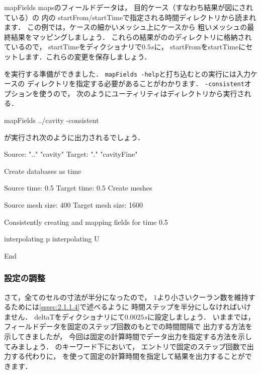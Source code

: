 mapFields mapsのフィールドデータは，
目的ケース（すなわち結果が図にされている）の
%
%
内の
startFrom/startTimeで指定される時間ディレクトリから読まれます．
この例では，ケースの細かいメッシュ上にケースから
粗いメッシュの最終結果をマッピングしましょう．
これらの結果がののディレクトリに格納されているので，
startTimeをディクショナリで$0.5\unit{s}$に，
startFromをstartTimeにセットします．これらの変更を保存しましょう．

を実行する準備ができました．
\texttt{mapFields -help}と打ち込むとの実行には入力ケースの
ディレクトリを指定する必要があることがわかります．
\texttt{-consistent}オプションを使うので，
次のようにユーティリティはディレクトリから実行される．
\begin{OFverbatim}[terminal]
mapFields ../cavity -consistent
\end{OFverbatim}
が実行され次のように出力されるでしょう．
\begin{OFverbatim}[baselinestretch=0.8, weight=\small]
Source: ".." "cavity"
Target: "." "cavityFine"

Create databases as time

Source time: 0.5
Target time: 0.5
Create meshes

Source mesh size: 400   Target mesh size: 1600

Consistently creating and mapping fields for time 0.5

    interpolating p
    interpolating U

End
\end{OFverbatim}

\subsubsection{設定の調整}
\label{sssec:2.1.5.4}
さて，全てのセルの寸法が半分になったので，
$1$より小さいクーラン数を維持するためには\autoref{sssec:2.1.1.4}で述べるように
時間ステップを半分にしなければいけません．
deltaTをディクショナリにて$0.0025\unit{s}$に設定しましょう．
いままでは，フィールドデータを固定のステップ回数のもとでの時間間隔で
出力する方法を示してきましたが，
今回は固定の計算時間でデータ出力を指定する方法を示してみましょう．
のキーワード下において，
%
%
エントリで固定のステップ回数で出力する代わりに，
%
%
を使って固定の計算時間を指定して結果を出力することができます．

